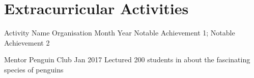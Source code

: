\section*{Extracurricular Activities}

\componentlist
    {Activity Name}
    {Organisation}
    {Month Year}
    {
        Notable Achievement 1;
        Notable Achievement 2
    }

\componentlist
    {Mentor}
    {Penguin Club}
    {Jan 2017}
    {
        Lectured 200 students in about the fascinating species of penguins
    }